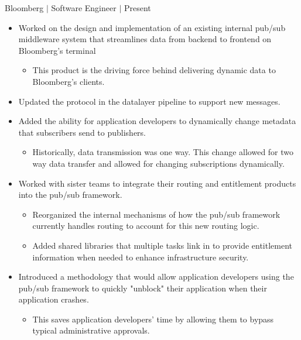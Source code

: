 \documentclass[12pt]{article}
\newcommand{\textDate}[3]{\noindent#1 $|$ #2 $|$ {\color{textGray} #3}}
\begin{document}
    \textDate{Bloomberg}{Software Engineer}{Present}
    \begin{small}
        \begin{itemize}
            \itemsep0em 
            \item {\color{textGray} Worked on the design and implementation of an existing internal pub/sub middleware system that streamlines data from backend to frontend on Bloomberg's terminal}
                \begin{itemize}[label=$\circ$,topsep=-5px,partopsep=0px]
                    \itemsep0em 
                    \item {\color{textGray} This product is the driving force behind delivering dynamic data to Bloomberg's clients.}
                \end{itemize}
            \item {\color{textGray} Updated the protocol in the datalayer pipeline to support new messages.}
            \item {\color{textGray} Added the ability for application developers to dynamically change metadata that subscribers send to publishers.}
                \begin{itemize}[label=$\circ$,topsep=-5px,partopsep=0px]
                    \itemsep0em 
                    \item {\color{textGray} Historically, data transmission was one way. This change allowed for two way data transfer and allowed for changing subscriptions dynamically.}
                \end{itemize}
            \item {\color{textGray} Worked with sister teams to integrate their routing and entitlement products into the pub/sub framework.}
                \begin{itemize}[label=$\circ$,topsep=-5px,partopsep=0px]
                    \itemsep0em 
                    \item {\color{textGray} Reorganized the internal mechanisms of how the pub/sub framework currently handles routing to account for this new routing logic.}
                    \item {\color{textGray} Added shared libraries that multiple tasks link in to provide entitlement information when needed to enhance infrastructure security.}
                \end{itemize}
            \item {\color{textGray} Introduced a methodology that would allow application developers using the pub/sub framework to quickly "unblock" their application when their application crashes.}
                \begin{itemize}[label=$\circ$,topsep=-5px,partopsep=0px]
                    \itemsep0em 
                    \item {\color{textGray} This saves application developers' time by allowing them to bypass typical administrative approvals.}
                \end{itemize}
        \end{itemize}
    \end{small}
\end{document}
